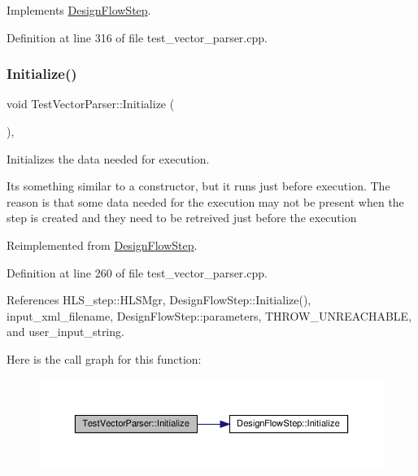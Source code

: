 Implements \hyperlink{classDesignFlowStep_a1783abe0c1d162a52da1e413d5d1ef05}{Design\+Flow\+Step}.



Definition at line 316 of file test\+\_\+vector\+\_\+parser.\+cpp.

\mbox{\label{classTestVectorParser_aa48917a5ac5ec20341754ec35edd6b3a}} 
\subsubsection{\texorpdfstring{Initialize()}{Initialize()}}
{\footnotesize\ttfamily void Test\+Vector\+Parser\+::\+Initialize (\begin{DoxyParamCaption}{ }\end{DoxyParamCaption})\hspace{0.3cm}{\ttfamily [override]}, {\ttfamily [virtual]}}



Initializes the data needed for execution. 

It\textquotesingle{}s something similar to a constructor, but it runs just before execution. The reason is that some data needed for the execution may not be present when the step is created and they need to be retreived just before the execution 

Reimplemented from \hyperlink{classDesignFlowStep_a44b50683382a094976e1d432a7784799}{Design\+Flow\+Step}.



Definition at line 260 of file test\+\_\+vector\+\_\+parser.\+cpp.



References H\+L\+S\+\_\+step\+::\+H\+L\+S\+Mgr, Design\+Flow\+Step\+::\+Initialize(), input\+\_\+xml\+\_\+filename, Design\+Flow\+Step\+::parameters, T\+H\+R\+O\+W\+\_\+\+U\+N\+R\+E\+A\+C\+H\+A\+B\+LE, and user\+\_\+input\+\_\+string.

Here is the call graph for this function\+:
\nopagebreak
\begin{figure}[H]
\begin{center}
\leavevmode
\includegraphics[width=350pt]{d8/d4e/classTestVectorParser_aa48917a5ac5ec20341754ec35edd6b3a_cgraph}
\end{center}
\end{figure}
\mbox{\label{classTestVectorParser_aee7869de887840eda1288d87a1e19a7b}} 
